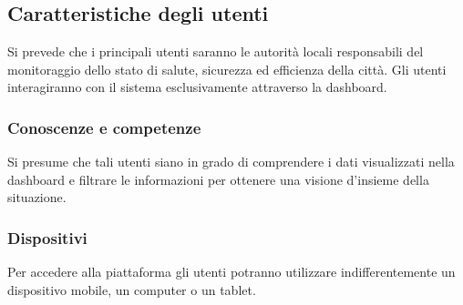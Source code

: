 \subsection{Caratteristiche degli utenti}
Si prevede che i principali utenti saranno le autorità locali responsabili del monitoraggio dello stato di salute, sicurezza ed efficienza della città. Gli utenti interagiranno con il sistema esclusivamente attraverso la dashboard.

\subsubsection{Conoscenze e competenze}
Si presume che tali utenti siano in grado di comprendere i dati visualizzati nella dashboard e filtrare le informazioni per ottenere una visione d’insieme della situazione.

\subsubsection{Dispositivi}
Per accedere alla piattaforma gli utenti potranno utilizzare indifferentemente un dispositivo mobile, un computer o un tablet.